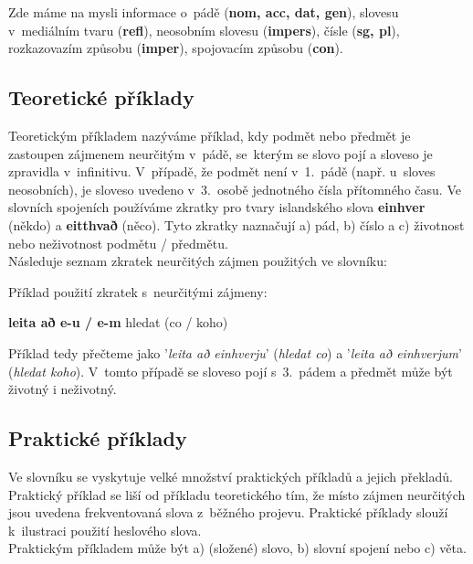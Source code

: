 Zde máme na mysli informace o~pádě (\textbf{nom, acc, dat, gen}), slovesu v~mediálním tvaru (\textbf{refl}), neosobním slovesu (\textbf{impers}), čísle (\textbf{sg, pl}), rozkazovazím způsobu (\textbf{imper}), spojovacím způsobu (\textbf{con}).

\subsection*{Teoretické příklady}

Teoretickým příkladem nazýváme příklad, kdy podmět nebo předmět je zastoupen zájmenem neurčitým v~pádě, se~kterým se slovo pojí a sloveso je zpravidla v~infinitivu. V~případě, že podmět není v~1.~pádě (např. u~sloves neosobních), je sloveso uvedeno v~3.~osobě jednotného čísla přítomného času.
Ve slovních spojeních používáme zkratky pro tvary islandského slova \textbf{einhver} (někdo) a \textbf{eitthvað} (něco). Tyto zkratky naznačují a) pád, b) číslo a c) životnost nebo neživotnost podmětu / předmětu.\\
Následuje seznam zkratek neurčitých zájmen použitých ve slovníku: \\

\tableD

Příklad použití zkratek s~neurčitými zájmeny:

\blspace
  \dicEntry {}   \textbf{leita að e-u / e-m} {hledat (co / koho)}  
\blspace

Příklad tedy přečteme jako '\textit{leita að einhverju}' (\textit{hledat co}) a '\textit{leita að einhverjum}' (\textit{hledat koho}). V~tomto případě se sloveso pojí s~3.~pádem a předmět může být životný i neživotný.

\subsection*{Praktické příklady}

Ve slovníku se vyskytuje velké množství praktických příkladů a jejich překladů. Praktický příklad se liší od příkladu teoretického tím, že místo zájmen neurčitých jsou uvedena frekventovaná slova z~běžného projevu. Praktické příklady slouží k~ilustraci použití
heslového slova.\\
Praktickým příkladem může být a) (složené) slovo, b) slovní spojení nebo c) věta.

